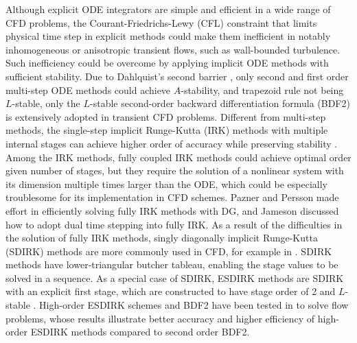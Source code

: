 \documentclass[preprint,12pt]{elsarticle}
\begin{document}
Although explicit ODE integrators
are simple and efficient in a wide range of
CFD problems,
the Courant-Friedrichs-Lewy (CFL) constraint
that limits physical time step in explicit
methods could make them inefficient in
notably inhomogeneous or anisotropic
transient flows,
such as wall-bounded turbulence.
Such inefficiency could be overcome by
applying implicit ODE methods with
sufficient stability.
Due to Dahlquist's second barrier
\cite{dahlquist1963special},
only second and first order multi-step ODE methods
could achieve $A$-stability, and
trapezoid rule not being $L$-stable,
only the $L$-stable
second-order backward differentiation formula (BDF2)
is extensively adopted in transient CFD problems.
Different from multi-step methods,
the single-step implicit Runge-Kutta (IRK) methods
with multiple internal stages
can achieve higher order of accuracy while
preserving stability \cite{butcher2016ODEBook}.
Among the IRK methods, fully coupled IRK methods
could achieve optimal order given number of stages,
but they require the solution of a nonlinear
system with its dimension multiple times larger
than the ODE, which could be especially
troublesome for its implementation in
CFD schemes.
Pazner and Persson
\cite{pazner2017stage}
made effort in efficiently solving
fully IRK methods with DG, and
Jameson \cite{jameson2017evaluation}
discussed how to adopt dual time stepping
into fully IRK.
As a result of the difficulties in the solution
of fully IRK methods,
singly diagonally implicit Runge-Kutta (SDIRK)
methods are more commonly used in CFD, for example in
\cite{wang2017compact_VR}.
SDIRK methods have lower-triangular butcher tableau,
enabling the stage values to be solved in a sequence.
As a special case of SDIRK,
ESDIRK methods are SDIRK with an explicit first stage,
which are constructed to have 
stage order of 2 and $L$-stable
\cite{kennedy2003additiveARK,kvaerno2004singly}.
High-order ESDIRK schemes and
BDF2 have been tested in
\cite{
    bijl2002implicitBDFvESDIRK,
    wang2007implicitDGTests}
to solve flow problems,
whose results illustrate
better accuracy and higher efficiency
of high-order ESDIRK methods
compared to second order BDF2.
\end{document}
